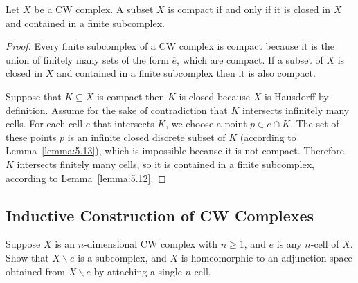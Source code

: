 \begin{theorem}{5.14}
	Let \( X \) be a CW complex. A subset \( X \) is compact if and only if it is closed in \( X \) and contained in a finite subcomplex.
\end{theorem}

\begin{proof}
	Every finite subcomplex of a CW complex is compact because it is the union of finitely many sets of the form \( \overline{e} \), which are compact. If a subset of \( X \) is closed in \( X \) and contained in a finite subcomplex then it is also compact.

	Suppose that \( K \subseteq X \) is compact then \( K \) is closed because \( X \) is Hausdorff by definition. Assume for the sake of contradiction that \( K \) intersects infinitely many cells. For each cell \( e \) that intersects \( K \), we choose a point \( p \in e\cap K \). The set of these points \( p \) is an infinite closed discrete subset of \( K \) (according to Lemma~\ref{lemma:5.13}), which is impossible because it is not compact. Therefore \( K \) intersects finitely many cells, so it is contained in a finite subcomplex, according to Lemma~\ref{lemma:5.12}.
\end{proof}

\subsection*{Inductive Construction of CW Complexes}

\begin{exercise}{5.19}
	Suppose \( X \) is an \( n \)-dimensional CW complex with \( n \geq 1 \), and \( e \) is any \( n \)-cell of \( X \). Show that \( X \smallsetminus e \) is a subcomplex, and \( X \) is homeomorphic to an adjunction space obtained from \( X \smallsetminus e \) by attaching a single \( n \)-cell.
\end{exercise}

